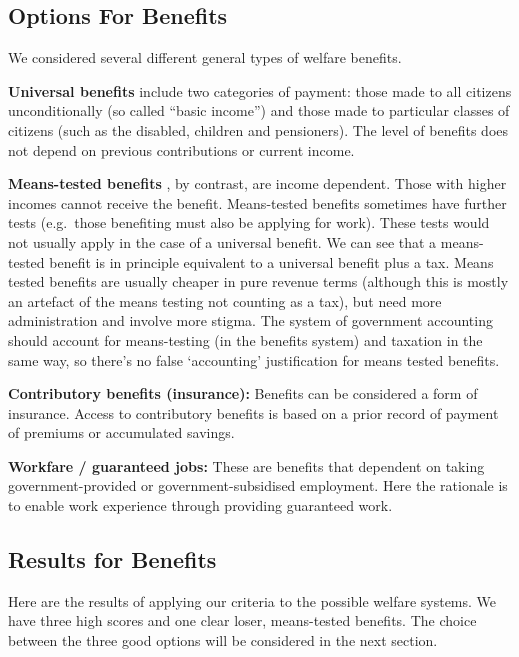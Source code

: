 \documentclass[]{tufte-handout}
\begin{document}
\hypertarget{options-for-benefits}{%
\subsection{Options For Benefits}\label{options-for-benefits}}

We considered several different general types of welfare benefits.

\textbf{Universal benefits} include two categories of payment: those
made to all citizens unconditionally (so called ``basic income'') and
those made to particular classes of citizens (such as the disabled,
children and pensioners). The level of benefits does not depend on
previous contributions or current income.

\textbf{Means-tested benefits} , by contrast, are income dependent.
Those with higher incomes cannot receive the benefit. Means-tested
benefits sometimes have further tests (e.g.~those benefiting must also
be applying for work). These tests would not usually apply in the case
of a universal benefit. We can see that a means-tested benefit is in
principle equivalent to a universal benefit plus a tax. Means tested
benefits are usually cheaper in pure revenue terms (although this is
mostly an artefact of the means testing not counting as a tax), but need
more administration and involve more stigma. The system of government
accounting should account for means-testing (in the benefits system) and
taxation in the same way, so there's no false `accounting' justification
for means tested benefits.

\textbf{Contributory benefits (insurance):} Benefits can be considered a
form of insurance. Access to contributory benefits is based on a prior
record of payment of premiums or accumulated savings.

\textbf{Workfare / guaranteed jobs:} These are benefits that dependent
on taking government-provided or government-subsidised employment. Here
the rationale is to enable work experience through providing guaranteed
work.

\hypertarget{results-for-benefits}{%
\subsection{Results for Benefits}\label{results-for-benefits}}

Here are the results of applying our criteria to the possible welfare
systems. We have three high scores and one clear loser, means-tested
benefits. The choice between the three good options will be considered
in the next section.
\end{document}
